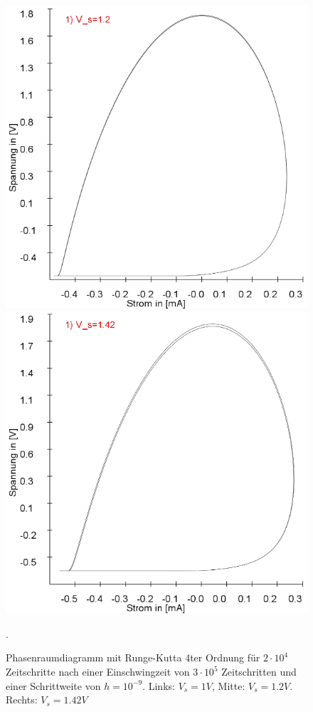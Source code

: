 \documentclass{scrartcl}
\begin{document}
\begin{figure}[!htbp]
\includegraphics[scale=0.28]{schwing-runge-nach300k-weitere20k-10-9-1,2V}
\includegraphics[scale=0.28]{schwing-runge-nach300k-weitere20k-10-9-1,42V}
\caption{Phasenraumdiagramm mit Runge-Kutta 4ter Ordnung für $2\cdot10^4$ Zeitschritte nach einer Einschwingzeit von  $3\cdot10^5$ Zeitschritten und einer Schrittweite von $h=10^{-9}$. Links: $V_s=1V$, Mitte: $V_s=1.2V$. Rechts: $V_s=1.42V$}. 
\label{fig:ldr-0002}
\end{figure}
\end{document}
